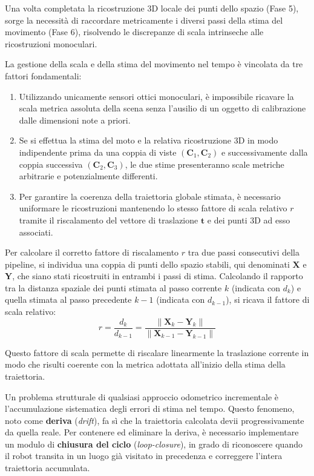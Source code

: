 ﻿\documentclass[11pt, a4paper]{article}
\begin{document}
Una volta completata la ricostruzione 3D locale dei punti dello spazio (Fase 5), sorge la necessità di raccordare metricamente i diversi passi della stima del movimento (Fase 6), risolvendo le discrepanze di scala intrinseche alle ricostruzioni monoculari.

La gestione della scala e della stima del movimento nel tempo è vincolata da tre fattori fondamentali:
\begin{enumerate}
    \item Utilizzando unicamente sensori ottici monoculari, è impossibile ricavare la scala metrica assoluta della scena senza l'ausilio di un oggetto di calibrazione dalle dimensioni note a priori.
    \item Se si effettua la stima del moto e la relativa ricostruzione 3D in modo indipendente prima da una coppia di viste $(\bm{C}_1, \bm{C}_2)$ e successivamente dalla coppia successiva $(\bm{C}_2, \bm{C}_3)$, le due stime presenteranno scale metriche arbitrarie e potenzialmente differenti.
    \item Per garantire la coerenza della traiettoria globale stimata, è necessario uniformare le ricostruzioni mantenendo lo stesso fattore di scala relativo $r$ tramite il riscalamento del vettore di traslazione $\bm{t}$ e dei punti 3D ad esso associati.
\end{enumerate}


Per calcolare il corretto fattore di riscalamento $r$ tra due passi consecutivi della pipeline, si individua una coppia di punti dello spazio stabili, qui denominati $\bm{X}$ e $\bm{Y}$, che siano stati ricostruiti in entrambi i passi di stima. Calcolando il rapporto tra la distanza spaziale dei punti stimata al passo corrente $k$ (indicata con $d_k$) e quella stimata al passo precedente $k-1$ (indicata con $d_{k-1}$), si ricava il fattore di scala relativo:
\[ \boxed{r = \frac{d_k}{d_{k-1}} = \frac{\lVert \bm{X}_k - \bm{Y}_k \rVert}{\lVert \bm{X}_{k-1} - \bm{Y}_{k-1} \rVert}} \]

Questo fattore di scala permette di riscalare linearmente la traslazione corrente in modo che risulti coerente con la metrica adottata all'inizio della stima della traiettoria.

Un problema strutturale di qualsiasi approccio odometrico incrementale è l'accumulazione sistematica degli errori di stima nel tempo. Questo fenomeno, noto come \textbf{deriva} (\emph{drift}), fa sì che la traiettoria calcolata devii progressivamente da quella reale. Per contenere ed eliminare la deriva, è necessario implementare un modulo di \textbf{chiusura del ciclo} (\emph{loop-closure}), in grado di riconoscere quando il robot transita in un luogo già visitato in precedenza e correggere l'intera traiettoria accumulata.
\end{document}
